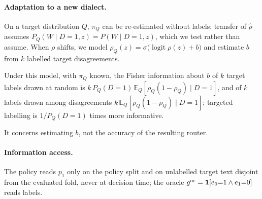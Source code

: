 \paragraph{Adaptation to a new dialect.}
On a target distribution $Q$, $\pi_Q$ can be re-estimated without labels; transfer of $\hat\rho$ assumes $P_Q(W\mid D{=}1,z)=P(W\mid D{=}1,z)$, which we test rather than assume. When $\rho$ shifts, we model $\rho_Q(z)=\sigma\big(\operatorname{logit}\rho(z)+b\big)$ and estimate $b$ from $k$ labelled target disagreements.

\begin{proposition}
\label{prop:efficiency}
Under this model, with $\pi_Q$ known, the Fisher information about $b$ of $k$ target labels drawn at random is $k\,P_Q(D{=}1)\,\mathbb E_Q[\rho_Q(1-\rho_Q)\mid D{=}1]$, and of $k$ labels drawn among disagreements $k\,\mathbb E_Q[\rho_Q(1-\rho_Q)\mid D{=}1]$; targeted labelling is $1/P_Q(D{=}1)$ times more informative.
\end{proposition}
It concerns estimating $b$, not the accuracy of the resulting router.

\paragraph{Information access.}
The policy reads $p_1$ only on the policy split and on unlabelled target text disjoint from the evaluated fold, never at decision time; the oracle $g^{\rm or}=\mathbf 1[e_0{=}1\wedge e_1{=}0]$ reads labels.
